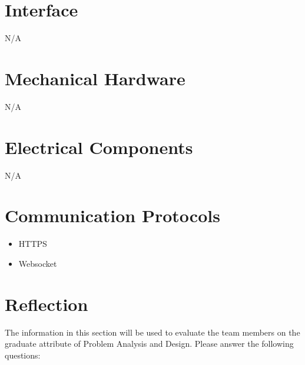\documentclass[12pt, titlepage]{article}
\begin{document}
\section{Interface}
N/A

\section{Mechanical Hardware}
N/A
\section{Electrical Components}
N/A
\section{Communication Protocols}
\begin{itemize}
    \item HTTPS
    \item Websocket
\end{itemize}

\section{Reflection}

The information in this section will be used to evaluate the team members on the
graduate attribute of Problem Analysis and Design.  Please answer the following questions:
\end{document}
